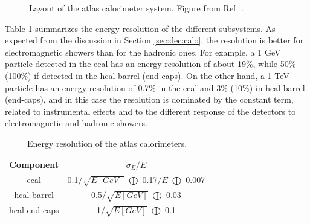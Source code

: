 \begin{figure}[ht]
\centering
{}
\caption{Layout of the \gls{atlas} calorimeter system. Figure from Ref. \cite{atlas:atlas}.}
\label{fig:atlas:calo}
\end{figure}

Table \ref{tab:atlas:cal:reso} summarizes the energy resolution of the different subsystems. As expected from the discussion in Section \ref{sec:dec:calo}, the resolution is better for electromagnetic showers than for the hadronic ones. For example, a 1 GeV particle detected in the \gls{ecal} has an energy resolution of about 19\%, while 50\% (100\%) if detected in the \gls{hcal} barrel (end-caps). On the other hand, a 1 TeV particle has an energy resolution of 0.7\% in the \gls{ecal} and 3\% (10\%) in  \gls{hcal} barrel (end-caps), and in this case the resolution is dominated by the constant term, 
related to instrumental effects and to the different response of the detectors to electromagnetic and hadronic showers. 

\begin{table}[ht]
\begin{center}
\begin{tabular}{c c }
\hline
Component & $\sigma_E / E$ \\
\hline 
\hline
\gls{ecal} & 0.1$/\sqrt{E[GeV]}$ $\bigoplus$ 0.17$/E$ $\bigoplus$ 0.007 \\ %
\hline
\gls{hcal} barrel & 0.5$/\sqrt{E[GeV]}$ $\bigoplus$ 0.03 \\
\hline
\gls{hcal} end caps & 1$/\sqrt{E[GeV]}$ $\bigoplus$ 0.1 \\
\hline
\end{tabular}
\end{center}
\caption{Energy resolution of the \gls{atlas} calorimeters.}
\label{tab:atlas:cal:reso}
\end{table}

